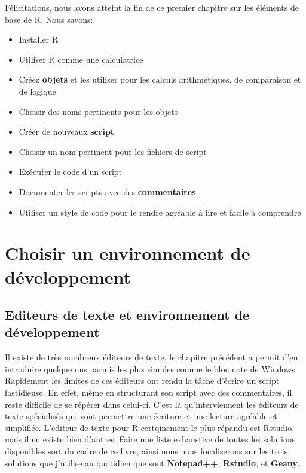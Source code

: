 \documentclass[]{book}
\providecommand{\tightlist}{%
  \setlength{\itemsep}{0pt}\setlength{\parskip}{0pt}}
\theoremstyle{definition}
\theoremstyle{definition}
\theoremstyle{definition}
\theoremstyle{remark}
\begin{document}
Félicitations, nous avons atteint la fin de ce premier chapitre sur les
éléments de base de R. Nous savons:

\begin{itemize}
\tightlist
\item
  Installer R
\item
  Utiliser R comme une calculatrice
\item
  Créez \textbf{objets} et les utiliser pour les calculs arithmétiques,
  de comparaison et de logique
\item
  Choisir des noms pertinents pour les objets
\item
  Créer de nouveaux \textbf{script}
\item
  Choisir un nom pertinent pour les fichiers de script
\item
  Exécuter le code d'un script
\item
  Documenter les scripts avec des \textbf{commentaires}
\item
  Utiliser un style de code pour le rendre agréable à lire et facile à
  comprendre
\end{itemize}

\hypertarget{IDE}{\chapter{Choisir un environnement de
développement}\label{IDE}}

\section{Editeurs de texte et environnement de
développement}\label{editeurs-de-texte-et-environnement-de-developpement}

Il existe de très nombreux éditeurs de texte, le chapitre précédent a
permit d'en introduire quelque uns parmis les plus simples comme le bloc
note de Windows. Rapidement les limites de ces éditeurs ont rendu la
tâche d'écrire un script fastidieuse. En effet, même en structurant son
script avec des commentaires, il reste difficile de se répérer dans
celui-ci. C'est là qu'interviennent les éditeurs de texte spécialisés
qui vont permettre une écriture et une lecture agréable et simplifiée.
L'éditeur de texte pour R certqinement le plus répandu est Rstudio, mais
il en existe bien d'autres. Faire une liste exhaustive de toutes les
solutions disponibles sort du cadre de ce livre, ainsi nous nous
focaliserons sur les trois solutions que j'utilise au quotidien que sont
\textbf{Notepad++}, \textbf{Rstudio}, et \textbf{Geany}.
\end{document}
